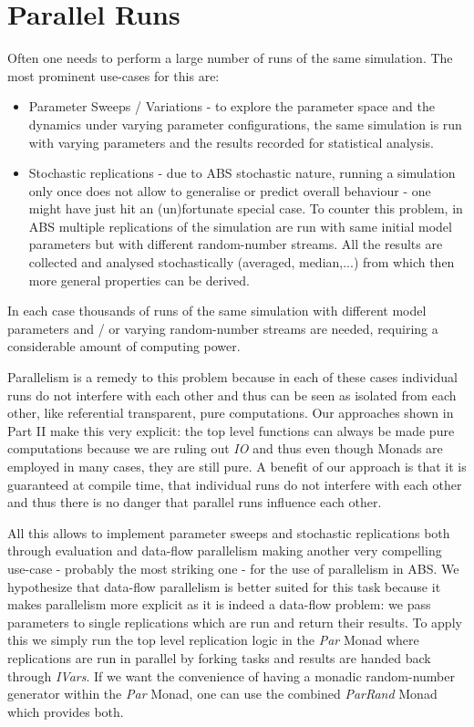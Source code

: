 \section{Parallel Runs}
Often one needs to perform a large number of runs of the same simulation. The most prominent use-cases for this are:

\begin{itemize}
	\item Parameter Sweeps / Variations - to explore the parameter space and the dynamics under varying parameter configurations, the same simulation is run with varying parameters and the results recorded for statistical analysis.
	
	\item Stochastic replications - due to ABS stochastic nature, running a simulation only once does not allow to generalise or predict overall behaviour - one might have just hit an (un)fortunate special case. To counter this problem, in ABS multiple replications of the  simulation are run with same initial model parameters but with different random-number streams. All the results are collected and analysed stochastically (averaged, median,...) from which then more general properties can be derived.
\end{itemize}

In each case thousands of runs of the same simulation with different model parameters and / or varying random-number streams are needed, requiring a considerable amount of computing power.

Parallelism is a remedy to this problem because in each of these cases individual runs do not interfere with each other and thus can be seen as isolated from each other, like referential transparent, pure computations. Our approaches shown in Part II make this very explicit: the top level functions can always be made pure computations because we are ruling out \textit{IO} and thus even though Monads are employed in many cases, they are still pure. A benefit of our approach is that it is guaranteed at compile time, that individual runs do not interfere with each other and thus there is no danger that parallel runs influence each other. 

All this allows to implement parameter sweeps and stochastic replications both through evaluation and data-flow parallelism making another very compelling use-case - probably the most striking one - for the use of parallelism in ABS. We hypothesize that data-flow parallelism is better suited for this task because it makes parallelism more explicit as it is indeed a data-flow problem: we pass parameters to single replications which are run and return their results. To apply this we simply run the top level replication logic in the \textit{Par} Monad where replications are run in parallel by forking tasks and results are handed back through \textit{IVars}. If we want the convenience of having a monadic random-number generator within the \textit{Par} Monad, one can use the combined \textit{ParRand} Monad which provides both.
